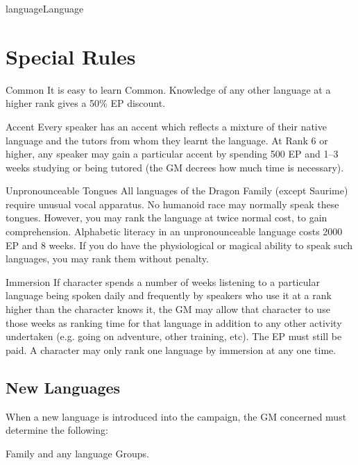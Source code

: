 \begin{Skill}[2.1]{language}{Language}
\section{Special Rules}

\begin{Description}

\item[Common] It is easy to learn Common.  Knowledge of any other
  language at a higher rank gives a 50\% EP discount.

\item[Accent] Every speaker has an accent which reflects a mixture of
  their native language and the tutors from whom they learnt the
  language. At Rank 6 or higher, any speaker may gain a particular
  accent by spending 500 EP and 1–3 weeks studying or being tutored
  (the GM decrees how much time is necessary).

\item[Unpronounceable Tongues] All languages of the Dragon Family
  (except Saurime) require unusual vocal apparatus.  No humanoid race
  may normally speak these tongues.  However, you may rank the
  language at twice normal cost, to gain comprehension.  Alphabetic
  literacy in an unpronounceable language costs 2000 EP and 8 weeks.
  If you do have the physiological or magical ability to speak such
  languages, you may rank them without penalty.

\item[Immersion] If character spends a number of weeks listening to a
  particular language being spoken daily and frequently by speakers
  who use it at a rank higher than the character knows it, the GM may
  allow that character to use those weeks as ranking time for that
  language in addition to any other activity undertaken (e.g. going on
  adventure, other training, etc).  The EP must still be paid.  A
  character may only rank one language by immersion at any one time.

\end{Description}

\subsection{New Languages}

When a new language is introduced into the campaign, the GM concerned
must determine the following:

\begin{Itemize}

\item Family and any language Groups. 


\end{Itemize}
\end{Skill}
